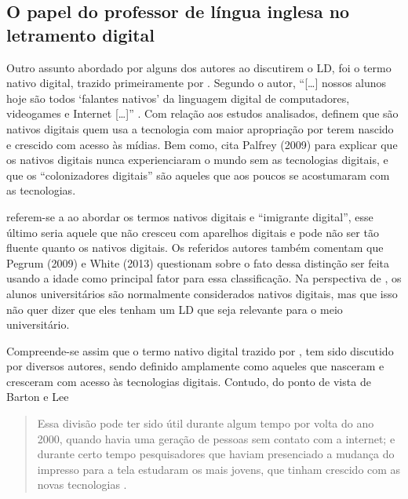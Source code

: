 \subsection{O papel do professor de língua inglesa no letramento digital}\label{sub-sec-papelprofessorletramentodigital}

Outro assunto abordado por alguns dos autores ao discutirem o LD, foi o
termo nativo digital, trazido primeiramente por \textcite{prensky2001digital}. Segundo
o autor, ``{[}\ldots{]} nossos alunos hoje são todos `falantes nativos' da
linguagem digital de computadores, videogames e Internet {[}\ldots{]}''
\cite[p.~1, tradução nossa]{prensky2001digital}. Com
relação aos estudos analisados, \textcite{oliveira2018multiletramentos} definem
que são nativos digitais quem usa a tecnologia com maior apropriação por
terem nascido e crescido com acesso às mídias. Bem como, \textcite{cladis2020shifting}
cita Palfrey (2009) para explicar que os nativos digitais nunca
experienciaram o mundo sem as tecnologias digitais, e que os
``colonizadores digitais'' são aqueles que aos poucos se acostumaram com
as tecnologias.

\textcite{dhillon2021investigation} referem-se a \textcite{prensky2001digital} ao abordar os termos
nativos digitais e ``imigrante digital'', esse último seria aquele que
não cresceu com aparelhos digitais e pode não ser tão fluente quanto os
nativos digitais. Os referidos autores também comentam que Pegrum (2009)
e White (2013) questionam sobre o fato dessa distinção ser feita usando
a idade como principal fator para essa classificação. Na perspectiva de
\textcite{roche2017assessing}, os alunos universitários são normalmente considerados
nativos digitais, mas que isso não quer dizer que eles tenham um LD que
seja relevante para o meio universitário.

Compreende-se assim que o termo nativo digital trazido por \textcite{prensky2001digital}, tem sido discutido por diversos autores, sendo definido
amplamente como aqueles que nasceram e cresceram com acesso às
tecnologias digitais. Contudo, do ponto de vista de Barton e Lee

\begin{quote}
Essa divisão pode ter sido útil durante algum tempo por volta do ano
2000, quando havia uma geração de pessoas sem contato com a internet; e
durante certo tempo pesquisadores que haviam presenciado a mudança do
impresso para a tela estudaram os mais jovens, que tinham crescido com
as novas tecnologias \cite[p. 23]{barton2015linguagem}.
\end{quote}

